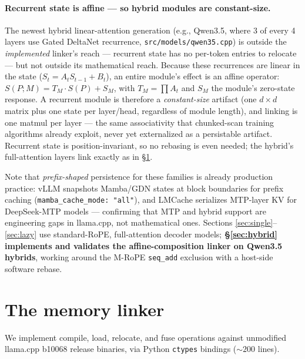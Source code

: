 \documentclass[11pt]{article}
\newcommand{\code}[1]{\texttt{#1}}
\begin{document}
\paragraph{Recurrent state is affine --- so hybrid modules are constant-size.}
The newest hybrid linear-attention generation (e.g., Qwen3.5, where 3 of every 4 layers use Gated DeltaNet recurrence, \code{src/models/qwen35.cpp}) is outside the \emph{implemented} linker's reach --- recurrent state has no per-token entries to relocate --- but not outside its mathematical reach. Because these recurrences are linear in the state ($S_t = A_t S_{t-1} + B_t$), an entire module's effect is an affine operator: $S(P;M) = T_M \cdot S(P) + S_M$, with $T_M = \prod A_t$ and $S_M$ the module's zero-state response. A recurrent module is therefore a \emph{constant-size} artifact (one $d \times d$ matrix plus one state per layer/head, regardless of module length), and linking is one matmul per layer --- the same associativity that chunked-scan training algorithms already exploit, never yet externalized as a persistable artifact. Recurrent state is position-invariant, so no rebasing is even needed; the hybrid's full-attention layers link exactly as in \S\ref{sec:linker}.

Note that \emph{prefix-shaped} persistence for these families is already production practice: vLLM snapshots Mamba/GDN states at block boundaries for prefix caching (\code{mamba\_cache\_mode: "all"}), and LMCache serializes MTP-layer KV for DeepSeek-MTP models --- confirming that MTP and hybrid support are engineering gaps in llama.cpp, not mathematical ones. Sections \ref{sec:single}--\ref{sec:lazy} use standard-RoPE, full-attention decoder models; \textbf{\S\ref{sec:hybrid} implements and validates the affine-composition linker on Qwen3.5 hybrids}, working around the M-RoPE \code{seq\_add} exclusion with a host-side software rebase.

\section{The memory linker}
\label{sec:linker}

We implement compile, load, relocate, and fuse operations against unmodified llama.cpp b10068 release binaries, via Python \code{ctypes} bindings (${\sim}200$ lines).
\end{document}
